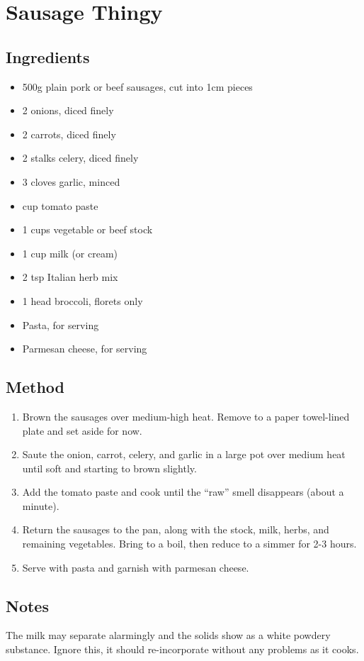 \clearpage
\section{Sausage Thingy}


\subsection{Ingredients}

\begin{itemize}
    \item 500g plain pork or beef sausages, cut into 1cm pieces
    \item 2 onions, diced finely
    \item 2 carrots, diced finely
    \item 2 stalks celery, diced finely
    \item 3 cloves garlic, minced
    \item {} cup tomato paste
    \item 1 cups vegetable or beef stock
    \item 1 cup milk (or cream)
    \item 2 tsp Italian herb mix
    \item 1 head broccoli, florets only
    \item Pasta, for serving
    \item Parmesan cheese, for serving
\end{itemize}

\subsection{Method}

\begin{enumerate}
    \item Brown the sausages over medium-high heat. Remove to a paper towel-lined plate and set aside for now.
    \item Saute the onion, carrot, celery, and garlic in a large pot over medium heat until soft and starting to brown slightly.
    \item Add the tomato paste and cook until the ``raw'' smell disappears (about a minute).
    \item Return the sausages to the pan, along with the stock, milk, herbs, and remaining vegetables. Bring to a boil, then reduce to a simmer for 2-3 hours.
    \item Serve with pasta and garnish with parmesan cheese.
\end{enumerate}

\subsection{Notes}

The milk may separate alarmingly and the solids show as a white powdery substance. Ignore this, it should re-incorporate without any problems as it cooks.

